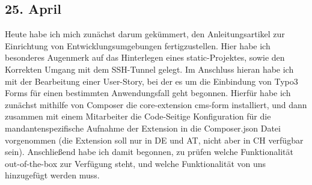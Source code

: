 \subsection{25. April}
Heute habe ich mich zunächst darum gekümmert, den Anleitungsartikel zur Einrichtung von Entwicklungsumgebungen fertigzustellen. Hier habe ich besonderes Augenmerk auf das Hinterlegen eines static-Projektes, sowie den Korrekten Umgang mit dem SSH-Tunnel gelegt. Im Anschluss hieran habe ich mit der Bearbeitung einer User-Story, bei der es um die Einbindung von Typo3 Forms für einen bestimmten Anwendungsfall geht begonnen. Hierfür habe ich zunächst mithilfe von Composer die core-extension cms-form installiert, und dann zusammen mit einem Mitarbeiter die Code-Seitige Konfiguration für die mandantenspezifische Aufnahme der Extension in die Composer.json Datei vorgenommen (die Extension soll nur in DE und AT, nicht aber in CH verfügbar sein). Anschließend habe ich damit begonnen, zu prüfen welche Funktionalität out-of-the-box zur Verfügung steht, und welche Funktionalität von uns hinzugefügt werden muss.